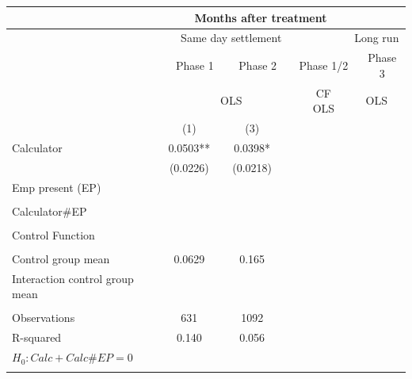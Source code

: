 \begin{tabular}{lcccccccc}
\toprule
\multicolumn{1}{|r}{} & \multicolumn{7}{c}{Months after treatment}            &  \\
\midrule
\multicolumn{1}{r|}{} & \multicolumn{5}{c}{Same day settlement} & \multicolumn{1}{c|}{} & \multicolumn{2}{c}{Long run} \\
\midrule
\midrule
\multicolumn{1}{r|}{} & \multicolumn{2}{c|}{Phase 1} & \multicolumn{2}{c|}{Phase 2} & \multicolumn{3}{c|}{Phase 1/2} & Phase 3 \\
\midrule
\multicolumn{1}{r|}{} & \multicolumn{5}{c|}{OLS}              & \multicolumn{1}{c|}{CF OLS} & \multicolumn{2}{c}{OLS} \\
\midrule
\midrule
      & (1)   &       & (3)   &       &       &       &       &  \\
Calculator  & 0.0503** &       & 0.0398* &       &       &       &       &  \\
      & (0.0226) &       & (0.0218) &       &       &       &       &  \\
Emp present (EP) &       &       &       &       &       &       &       &  \\
      &       &       &       &       &       &       &       &  \\
Calculator\#EP &       &       &       &       &       &       &       &  \\
      &       &       &       &       &       &       &       &  \\
Control Function &       &       &       &       &       &       &       &  \\
      &       &       &       &       &       &       &       &  \\
\midrule
Control group mean & 0.0629 &       & 0.165 &       &       &       &       &  \\
Interaction control group mean &       &       &       &       &       &       &       &  \\
\midrule
      &       &       &       &       &       &       &       &  \\
\midrule
Observations & 631   &       & 1092  &       &       &       &       &  \\
R-squared & 0.140 &       & 0.056 &       &       &       &       &  \\
$H_0 : Calc + Calc\# EP = 0$ &       &       &       &       &       &       &       &  \\
\midrule
\midrule
      &       &       &       &       &       &       &       &  \\
\midrule
\midrule
\end{tabular}%
